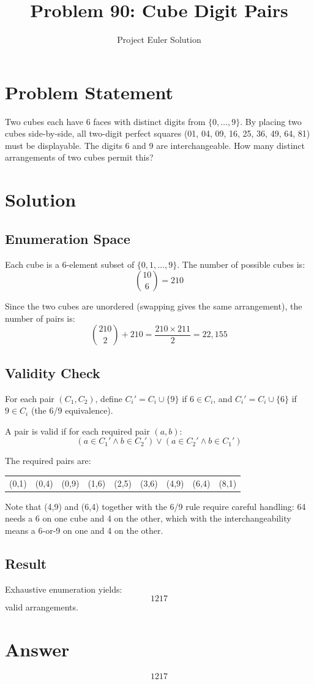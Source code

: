 \documentclass[12pt,a4paper]{article}
\title{Problem 90: Cube Digit Pairs}
\author{Project Euler Solution}
\date{}
\begin{document}
\maketitle

\section{Problem Statement}
Two cubes each have 6 faces with distinct digits from $\{0, \ldots, 9\}$. By placing two cubes side-by-side, all two-digit perfect squares (01, 04, 09, 16, 25, 36, 49, 64, 81) must be displayable. The digits 6 and 9 are interchangeable. How many distinct arrangements of two cubes permit this?

\section{Solution}

\subsection{Enumeration Space}
Each cube is a 6-element subset of $\{0, 1, \ldots, 9\}$. The number of possible cubes is:
\[
\binom{10}{6} = 210
\]

Since the two cubes are unordered (swapping gives the same arrangement), the number of pairs is:
\[
\binom{210}{2} + 210 = \frac{210 \times 211}{2} = 22{,}155
\]

\subsection{Validity Check}
For each pair $(C_1, C_2)$, define $C_i' = C_i \cup \{9\}$ if $6 \in C_i$, and $C_i' = C_i \cup \{6\}$ if $9 \in C_i$ (the 6/9 equivalence).

A pair is valid if for each required pair $(a, b)$:
\[
(a \in C_1' \wedge b \in C_2') \vee (a \in C_2' \wedge b \in C_1')
\]

The required pairs are:
\begin{center}
\begin{tabular}{ccccccccc}
(0,1) & (0,4) & (0,9) & (1,6) & (2,5) & (3,6) & (4,9) & (6,4) & (8,1)
\end{tabular}
\end{center}

Note that (4,9) and (6,4) together with the 6/9 rule require careful handling: 64 needs a 6 on one cube and 4 on the other, which with the interchangeability means a 6-or-9 on one and 4 on the other.

\subsection{Result}
Exhaustive enumeration yields:
\[
\boxed{1217}
\]
valid arrangements.

\section{Answer}

\[
\boxed{1217}
\]
\end{document}
